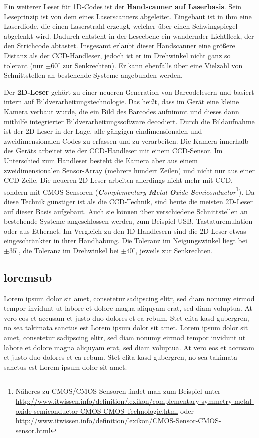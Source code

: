 Ein weiterer Leser für 1D-Codes ist der \textbf{Handscanner auf Laserbasis}. Sein Leseprinzip ist von dem eines Laserscanners abgeleitet. Eingebaut ist in ihm eine Laserdiode, die einen Laserstrahl erzeugt, welcher über einen Schwingspiegel abgelenkt wird. Dadurch entsteht in der Leseebene ein wandernder Lichtfleck, der den Strichcode abtastet. Insgesamt erlaubt dieser Handscanner eine größere Distanz als der CCD-Handleser, jedoch ist er im Drehwinkel nicht ganz so tolerant (nur $\pm60^\circ$ zur Senkrechten). Er kann ebenfalls über eine Vielzahl von Schnittstellen an bestehende Systeme angebunden werden.

Der \textbf{2D-Leser} gehört zu einer neueren Generation von Barcodelesern und basiert intern auf Bildverarbeitungstechnologie. Das heißt, dass im Gerät eine kleine Kamera verbaut wurde, die ein Bild des Barcodes aufnimmt und dieses dann mithilfe integrierter Bildverarbeitungssoftware decodiert. Durch die Bildaufnahme ist der 2D-Leser in der Lage, alle gängigen eindimensionalen und zweidimensionalen Codes zu erfassen und zu verarbeiten. Die Kamera innerhalb des Geräts arbeitet wie der CCD-Handleser mit einem CCD-Sensor. Im Unterschied zum Handleser besteht die Kamera aber aus einem zweidimensionalen Sensor-Array (mehrere hundert Zeilen) und nicht nur aus einer CCD-Zeile. 
Die neueren 2D-Leser arbeiten allerdings nicht mehr mit CCD, sondern mit CMOS-Sensoren (\textit{\textbf{C}omplementary \textbf{M}etal \textbf{O}xide \textbf{S}emiconductor}\footnote{Näheres zu CMOS/CMOS-Sensoren findet man zum Beispiel unter \url{http://www.itwissen.info/definition/lexikon/complementary-symmetry-metal-oxide-semiconductor-CMOS-CMOS-Technologie.html} oder \url{http://www.itwissen.info/definition/lexikon/CMOS-Sensor-CMOS-sensor.html}}). Da diese Technik günstiger ist als die CCD-Technik, sind heute die meisten 2D-Leser auf dieser Basis aufgebaut. Auch sie können über verschiedene Schnittstellen an bestehende Systeme angeschlossen werden, zum Beispiel USB, Tastaturemulation oder aus Ethernet. Im Vergleich zu den 1D-Handlesern sind die 2D-Leser etwas eingeschränkter in ihrer Handhabung. Die Toleranz im Neigungswinkel liegt bei $\pm35^\circ$, die Toleranz im Drehwinkel bei $\pm40^\circ$, jeweils zur Senkrechten.   

\subsection{loremsub}
Lorem ipsum dolor sit amet, consetetur sadipscing elitr, sed diam nonumy eirmod tempor invidunt ut labore et dolore magna aliquyam erat, sed diam voluptua. At vero eos et accusam et justo duo dolores et ea rebum. Stet clita kasd gubergren, no sea takimata sanctus est Lorem ipsum dolor sit amet. Lorem ipsum dolor sit amet, consetetur sadipscing elitr, sed diam nonumy eirmod tempor invidunt ut labore et dolore magna aliquyam erat, sed diam voluptua. At vero eos et accusam et justo duo dolores et ea rebum. Stet clita kasd gubergren, no sea takimata sanctus est Lorem ipsum dolor sit amet.
\pagebreak
